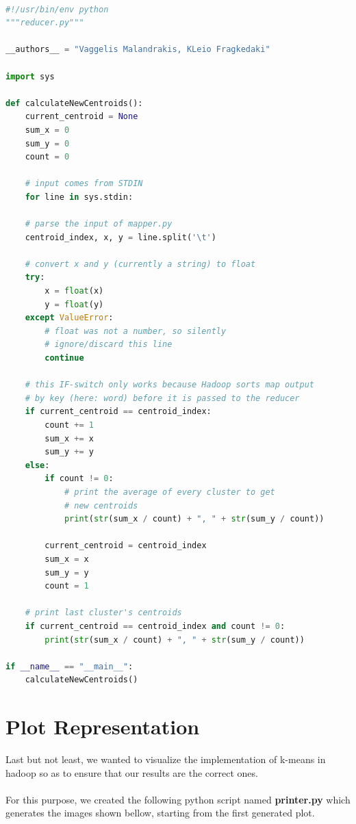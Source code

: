   \HRule \\[0.2cm] %
  
\begin{lstlisting}[language=Python]
#!/usr/bin/env python
"""reducer.py"""

__authors__ = "Vaggelis Malandrakis, KLeio Fragkedaki"

import sys

def calculateNewCentroids():
	current_centroid = None
	sum_x = 0
	sum_y = 0
	count = 0

	# input comes from STDIN
	for line in sys.stdin:
	
	# parse the input of mapper.py
	centroid_index, x, y = line.split('\t')
	
	# convert x and y (currently a string) to float
	try:
		x = float(x)
		y = float(y)
	except ValueError:
		# float was not a number, so silently
		# ignore/discard this line
		continue
	
	# this IF-switch only works because Hadoop sorts map output
	# by key (here: word) before it is passed to the reducer
	if current_centroid == centroid_index:
		count += 1
		sum_x += x
		sum_y += y
	else:
		if count != 0:
			# print the average of every cluster to get  
			# new centroids
			print(str(sum_x / count) + ", " + str(sum_y / count))
		
		current_centroid = centroid_index
		sum_x = x
		sum_y = y
		count = 1
	
	# print last cluster's centroids
	if current_centroid == centroid_index and count != 0:
		print(str(sum_x / count) + ", " + str(sum_y / count))

if __name__ == "__main__":
	calculateNewCentroids()
\end{lstlisting}

\section{Plot Representation}
Last but not least, we wanted to visualize the implementation of k-means in hadoop so as to ensure that our results are the correct ones. \\\\
For this purpose, we created the following python script named \textbf{printer.py} which generates the images shown bellow, starting from the first generated plot.

